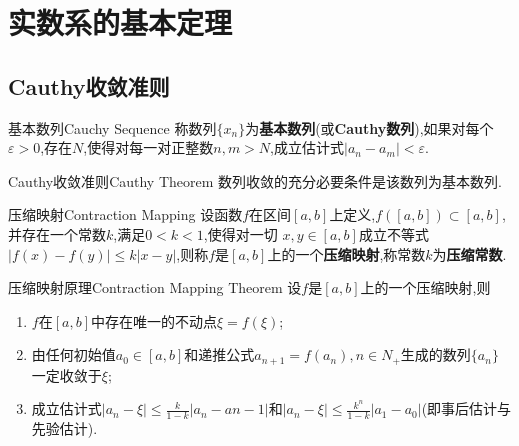 \documentclass[cn,chinese,fontset]{elegantbook}
\begin{document}
    \chapter{实数系的基本定理}
        \section{Cauthy收敛准则}
        
        \begin{definition}{基本数列}{Cauchy Sequence}
            称数列$\{x_n\}$为\textbf{基本数列}(或\textbf{Cauthy数列}),如果对每个$\varepsilon>0$,存在$N$,使得对每一对正整数$n,m>N$,成立估计式$\lvert a_n-a_m\rvert<\varepsilon$.
        \end{definition}
        
        \begin{theorem}{Cauthy收敛准则}{Cauthy Theorem} 
            数列收敛的充分必要条件是该数列为基本数列.
        \end{theorem}
        
        \begin{definition}{压缩映射}{Contraction Mapping}
            设函数$f$在区间$[a,b]$上定义,$f([a,b])\subset [a,b]$,并存在一个常数$k$,满足$0<k<1$,使得对一切 $x,y\in [a,b]$成立不等式$\lvert f(x)-f(y)\rvert\leqslant k\lvert x-y\rvert$,则称$f$是$[a,b]$上的一个\textbf{压缩映射},称常数$k$为\textbf{压缩常数}.
        \end{definition}
        \begin{theorem}{压缩映射原理}{Contraction Mapping Theorem}
            设$f$是$[a,b]$上的一个压缩映射,则
            \begin{enumerate}
                \item $f$在$[a,b]$中存在唯一的不动点$\xi=f(\xi)$;
                \item 由任何初始值$a_0\in[a,b]$和递推公式$a_{n+1}=f(a_n),n\in N_+$生成的数列$\{a_n\}$一定收敛于$\xi$;
                \item 成立估计式$\lvert a_n-\xi\rvert\leqslant\frac{k}{1-k}\lvert a_n-a{n-1}\rvert$和$\lvert a_n-\xi\rvert\leqslant\frac{k^n}{1-k}\lvert a_1-a_0\rvert$(即事后估计与先验估计).
            \end{enumerate}
        \end{theorem}
\end{document}
